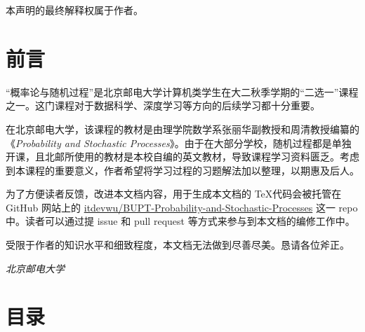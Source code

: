 本声明的最终解释权属于作者。


\newpage
\section*{前言}

“概率论与随机过程”是北京邮电大学计算机类学生在大二秋季学期的“二选一”课程之一。这门课程对于数据科学、深度学习等方向的后续学习都十分重要。

在北京邮电大学，该课程的教材是由理学院数学系张丽华副教授和周清教授编纂的《\textit{Probability and Stochastic Processes}》。由于在大部分学校，随机过程都是单独开课，且北邮所使用的教材是本校自编的英文教材，导致课程学习资料匮乏。考虑到本课程的重要意义，作者希望将学习过程的习题解法加以整理，以期惠及后人。

为了方便读者反馈，改进本文档内容，用于生成本文档的 \TeX 代码会被托管在 GitHub 网站上的 \href{https://github.com/itdevwu/BUPT-Probability-and-Stochastic-Processes}{itdevwu/BUPT-Probability-and-Stochastic-Processes} 这一 repo 中。读者可以通过提 issue 和 pull request 等方式来参与到本文档的编修工作中。

受限于作者的知识水平和细致程度，本文档无法做到尽善尽美。恳请各位斧正。

\begin{flushright}
    \vfill \textit{
        北京邮电大学\\
        \theauthor
    }
\end{flushright}



\newpage
\section*{目录}
\vspace{-3cm}
\tableofcontents
